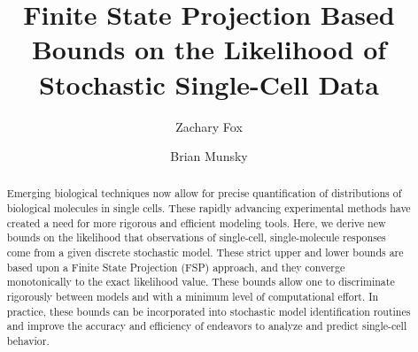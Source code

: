 \documentclass[aip,preprint,jcp,12pt,superscriptaddress]{revtex4-1}
\begin{document}
\title{Finite State Projection Based Bounds on the Likelihood of Stochastic Single-Cell Data}
\author{Zachary Fox}
\author{Brian Munsky}
\begin{abstract}
Emerging biological techniques now allow for precise quantification of distributions of biological molecules in single cells.
These rapidly advancing experimental methods have created a need for more rigorous and efficient modeling tools.
Here, we derive new bounds on the likelihood that observations of single-cell, single-molecule responses come from a given discrete stochastic model.  
These strict upper and lower bounds are based upon a Finite State Projection (FSP) approach, and they converge monotonically to the exact likelihood value.  These bounds allow one to discriminate rigorously between models and with a minimum level of computational effort.  In practice, these bounds can be incorporated into stochastic model identification routines and improve the accuracy and efficiency of endeavors to analyze and predict single-cell behavior. 
\end{abstract}
\maketitle 



\end{document}
